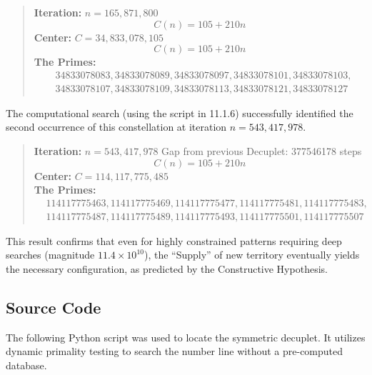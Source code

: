 \documentclass[sn-mathphys-num, pdflatex]{sn-jnl}
\begin{document}
\begin{quote}

\textbf{Iteration:} $n = 165,871,800$
\begin{equation}
   C(n) = 105 + 210n
\end{equation}
\textbf{Center:} $C = 34,833,078,105$
\begin{equation}
   C(n) = 105 + 210n
\end{equation}
\textbf{The Primes:}
\begin{align*}
    &34833078083, 34833078089, 34833078097, 34833078101, 34833078103, \\
    &34833078107, 34833078109, 34833078113, 34833078121, 34833078127
\end{align*}
\end{quote}
The computational search (using the script in 11.1.6) successfully identified the second occurrence of this constellation at iteration $n = 543,417,978$.

\begin{quote}
\textbf{Iteration:} $n = 543,417,978$ Gap from previous Decuplet: 377546178 steps
\begin{equation}
    C(n) = 105 + 210n
\end{equation}
\textbf{Center:} $C = 114,117,775,485$ \\
\textbf{The Primes:}
\begin{align*}
    &114117775463, 114117775469, 114117775477, 114117775481, 114117775483, \\
    &114117775487, 114117775489, 114117775493, 114117775501, 114117775507
\end{align*}
\end{quote}
This result confirms that even for highly constrained patterns requiring deep searches (magnitude $11.4 \times 10^{10}$), the ``Supply'' of new territory eventually yields the necessary configuration, as predicted by the Constructive Hypothesis.

\subsection{Source Code}
The following Python script was used to locate the symmetric decuplet. It utilizes dynamic primality testing to search the number line without a pre-computed database.
\end{document}
